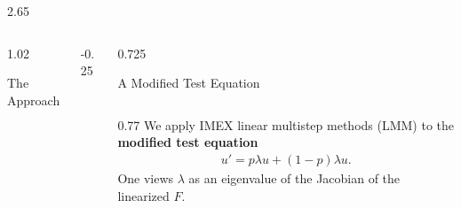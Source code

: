 \documentclass[]{beamer} %
\newlength{\sepwid}
\newlength{\onecolwid}
\newlength{\twocolwid}
\begin{document}
\begin{frame}[t]
\begin{columns}[t]
\begin{column}{2.65\onecolwid}
\begin{columns}[t,totalwidth=2.55\onecolwid]
\begin{column}{1.02\onecolwid}
\begin{block}{The Approach}
							
							
							
						\end{block}
					\end{column} %
					\begin{column}{-0.25\sepwid}\end{column} %
					\begin{column}{0.725\twocolwid}\vspace{-0.8in} %
						\begin{block}{A Modified Test Equation}
							\begin{columns}[t,totalwidth=0.750\twocolwid] %
								\begin{column}{0.77\onecolwid}%
									We apply IMEX linear multistep methods (LMM) \cite{Ascher1995} to the \textbf{modified test equation}
									\begin{align}
									u' = p\lambda u + (1-p)\lambda u.
									\label{modified test eqn}
									\end{align} 
									One views $\lambda$ as an eigenvalue of the Jacobian of the linearized $F$.
									
									
									

\end{column}
\end{columns}
\end{block}
\end{column}
\end{columns}
\end{column}
\end{columns}
\end{frame}
\end{document}
